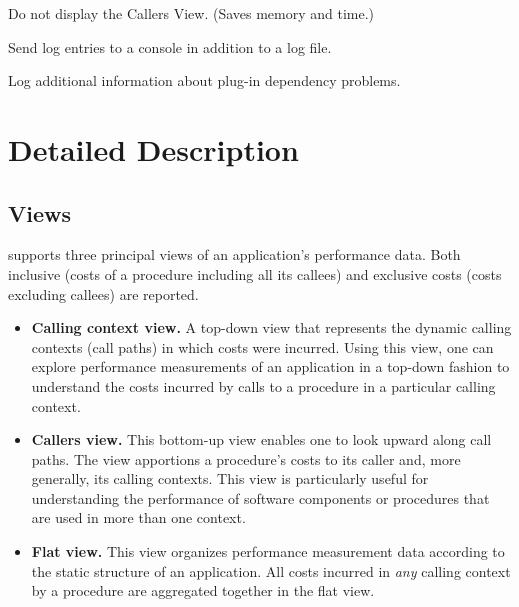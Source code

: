 \documentclass[english]{article}
\begin{document}
\begin{Description}
\item[\Opt{-n}]
Do not display the Callers View.  (Saves memory and time.)

\item[\Opt{-consolelog}]
Send log entries to a console in addition to a log file.

\item[\Opt{-debug}]
Log additional information about plug-in dependency problems.

\end{Description}


\section{Detailed Description}

\subsection{Views}

 supports three principal views of an application's performance data.  Both inclusive (costs of a procedure including all its callees) and exclusive costs (costs excluding callees) are reported.

\begin{itemize}
  \item \textbf{Calling context view.}
A top-down view that represents the dynamic calling contexts (call paths) in which costs were incurred.
Using this view, one can explore performance measurements of an application in a top-down fashion to understand the costs incurred by calls to a procedure in a particular calling context.

  \item \textbf{Callers view.}
This bottom-up view enables one to look upward along call paths.
The view apportions a procedure's costs to its caller and, more generally, its calling contexts.
This view is particularly useful for understanding the performance of software components or procedures that are used in more than one context.

  \item \textbf{Flat view.}
This view organizes performance measurement data according to the static structure of an application.
All costs incurred in \emph{any} calling context by a procedure are aggregated together in the flat view.
\end{itemize}
\end{document}
